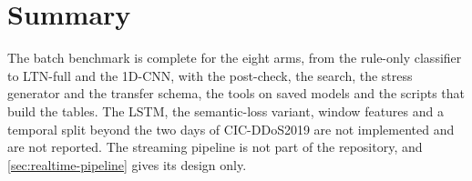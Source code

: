 \section{Summary}
\label{sec:impl-summary}

The batch benchmark is complete for the eight arms, from the rule-only classifier to LTN-full
and the 1D-CNN, with the post-check, the search, the stress generator and the transfer schema, the
tools on saved models and the scripts that build the tables. The LSTM, the semantic-loss
variant, window features and a temporal split beyond the two days of CIC-DDoS2019 are not
implemented and are not reported. The streaming pipeline is not part of the
repository, and \cref{sec:realtime-pipeline} gives its design only.
